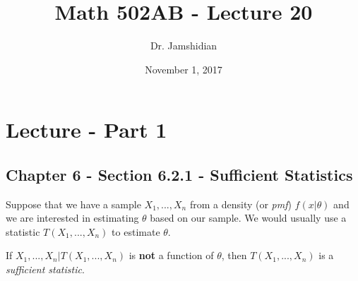 \documentclass{article}
\title{Math 502AB - Lecture 20}
\author{Dr. Jamshidian}
\date{November 1, 2017}
\begin{document}
\maketitle

\section{Lecture - Part 1}

\subsection{Chapter 6 - Section 6.2.1 - Sufficient Statistics}

Suppose that we have a sample $X_1,...,X_n$ from a density (or \textit{pmf}) $f(x|\theta)$ and we are interested in estimating $\theta$ based on our sample. We would usually use a statistic $T(X_1,...,X_n)$ to estimate $\theta$.

If $X_1,...,X_n|T(X_1,...,X_n)$ is \textbf{not} a function of $\theta$, then $T(X_1,...,X_n)$ is a \textit{sufficient statistic}.
\end{document}
